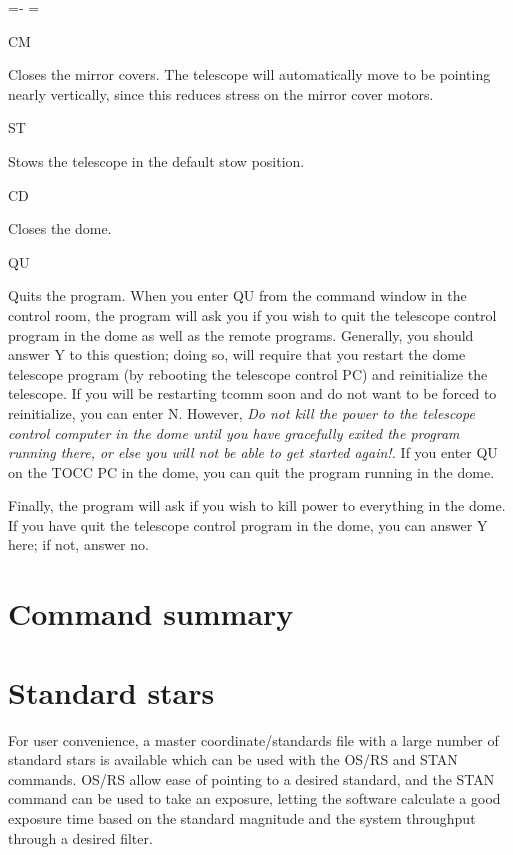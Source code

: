 \documentclass[10pt]{report}
\renewcommand{\[}{\begin{eqnarray}}
\renewcommand{\]}{\end{eqnarray}}
\newenvironment{hanging}{
	\begin{list}{}{
		\labelsep=0pt
		\labelwidth=0pt
		\listparindent=0pt
		\itemindent=-\leftmargini
		\leftmargin=\leftmargini
	}
}{
	\end{list}
}
\begin{document}
\begin{hanging}
\item{CM}

Closes the mirror covers. The telescope will automatically move to be 
pointing nearly vertically, since this reduces stress on the mirror cover
motors. 

\item{ST}

Stows the telescope in the default stow position.

\item{CD}

Closes the dome.

\item{QU}

Quits the program. When you enter QU from the command window in the control 
room,  the program will ask you if you wish to quit the telescope control
program in the dome as well as the remote programs. Generally, you should
answer Y to this question; doing so, will require that you restart the
dome telescope program (by rebooting the telescope control PC) and reinitialize
the telescope. If you will be restarting tcomm soon and do not want to be
forced to reinitialize, you can enter N. However,
\textit{Do not kill the power to the telescope control computer in the dome
until you have gracefully exited the program running there, or else you
will not be able to get started again!.}
If you enter QU on the TOCC PC in the dome, you can quit the program running
in the dome.

Finally, the program will ask if you wish to kill power to everything in
the dome. If you have quit the telescope control program in the dome, you
can answer Y here; if not, answer no.

\end{hanging}

\appendix

\chapter{Command summary}



\chapter{Standard stars }

For user convenience, a master coordinate/standards file with a large number 
of standard stars is available which can be used with the OS/RS and STAN
commands. OS/RS allow ease of pointing to a desired standard, and the STAN
command can be used to take an exposure, letting the software calculate a
good exposure time based on the standard magnitude and the system
throughput through a desired filter.
\end{document}
